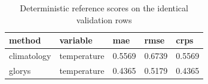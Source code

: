 \begin{table}[htbp]
\centering
\caption{Deterministic reference scores on the identical validation rows}
\begin{tabular}{lllll}
\toprule
method & variable & mae & rmse & crps \\
\midrule
climatology & temperature & 0.5569 & 0.6739 & 0.5569 \\
glorys & temperature & 0.4365 & 0.5179 & 0.4365 \\
\bottomrule
\end{tabular}
\end{table}
